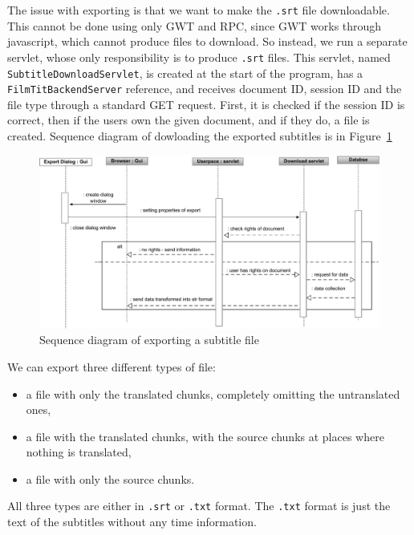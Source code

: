 

The issue with exporting is that we want to make the {\tt .srt} file downloadable. This cannot be done using only GWT and RPC, since GWT works through javascript, which cannot produce files to download. So instead, we run a separate servlet, whose only responsibility is to produce {\tt .srt} files. This servlet, named \texttt{SubtitleDownloadServlet}, is created at the start of the program, has a \texttt{FilmTitBackendServer} reference, and receives document ID, session ID and the file type through a standard GET request. First, it is checked if the session ID is correct, then if the users own the given document, and if they do, a file is created. Sequence diagram of  dowloading the exported subtitles is in Figure~\ref{fig:export_diagram}

\begin{figure}[h]
\begin{center}
\includegraphics[scale=0.6]{figures/download_diagram.pdf}
\end{center}
\caption{Sequence diagram of exporting a subtitle file}
\label{fig:export_diagram}
\end{figure}

We can export three different types of file:
\begin{itemize}
    \item a file with only the translated chunks, completely omitting the untranslated ones,
    \item a file with the translated chunks, with the source chunks at places where nothing is translated,
    \item a file with only the source chunks.
\end{itemize}

All three types are either in {\tt .srt} or {\tt .txt} format. The {\tt .txt} format is just the text of the subtitles without any time information.